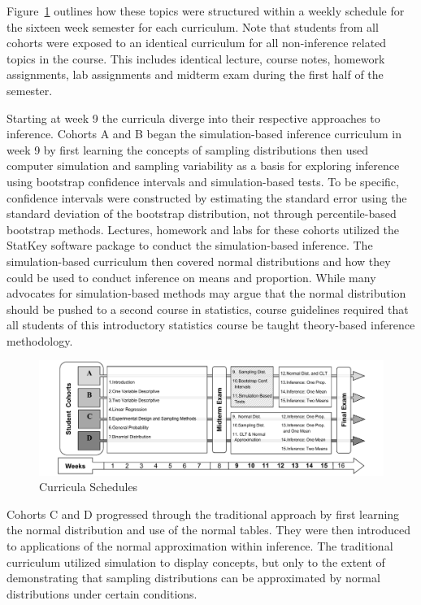 \documentclass[11pt]{isuthesis}\usepackage[]{graphicx}\usepackage[]{color}
\begin{document}
Figure~\ref{fig:CurricSched} outlines how these topics were structured within a weekly schedule for the sixteen week semester for each curriculum.  Note that students from all cohorts were exposed to an identical curriculum for all non-inference related topics in the course. This includes identical lecture, course notes, homework assignments, lab assignments and midterm exam during the first half of the semester.

Starting at week 9 the curricula diverge into their respective approaches to inference.  Cohorts A and B began the simulation-based inference curriculum in week 9 by first learning the concepts of sampling distributions then used computer simulation and sampling variability as a basis for exploring inference using bootstrap confidence intervals and simulation-based tests.  To be specific, confidence intervals were constructed by estimating the standard error using the standard deviation of the bootstrap distribution, not through percentile-based bootstrap methods.  Lectures, homework and labs for these cohorts utilized the StatKey software package \citep{Lock5} to conduct the simulation-based inference. The simulation-based curriculum then covered normal distributions and how they could be used to conduct inference on means and proportion.  While many advocates for simulation-based methods may argue that the normal distribution should be pushed to a second course in statistics, course guidelines required that all students of this introductory statistics course be taught theory-based inference methodology.  

\begin{figure}[hbtp]
\centering
\includegraphics[keepaspectratio=true, width=1\textwidth]{CurriculumStudy/CurriculaPaths2.pdf}
\caption{\label{fig:CurricSched} Curricula Schedules}
\end{figure}

Cohorts C and D progressed through the traditional approach by first learning the normal distribution and use of the normal tables. They were then introduced to applications of the normal approximation within inference.  The traditional curriculum utilized simulation to display concepts, but only to the extent of demonstrating that sampling distributions can be approximated by normal distributions under certain conditions.  
\end{document}
